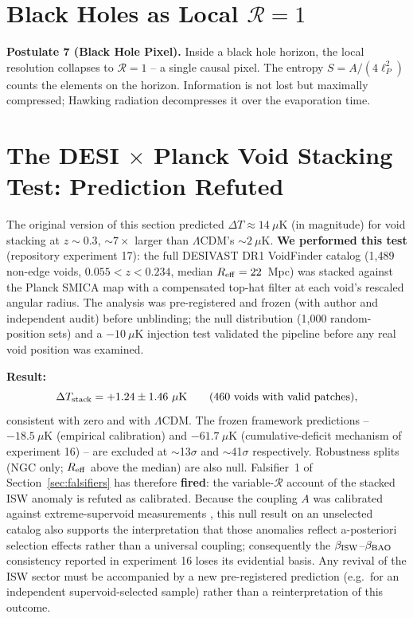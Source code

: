 \documentclass[12pt]{article}
\begin{document}
\section{Black Holes as Local $\mathcal{R}=1$}
\label{sec:bh}

{\bf Postulate 7 (Black Hole Pixel).} Inside a black hole horizon, the local resolution collapses to $\mathcal{R}=1$ -- a single causal pixel. The entropy $S = A/(4\ell_P^2)$ counts the elements on the horizon. Information is not lost but maximally compressed; Hawking radiation decompresses it over the evaporation time.

\section{The DESI $\times$ Planck Void Stacking Test: Prediction Refuted}
\label{sec:prediction}

The original version of this section predicted $\Delta T \approx 14\ \mu$K (in magnitude) for void stacking at $z\sim0.3$, $\sim7\times$ larger than $\Lambda$CDM's $\sim2\ \mu$K. {\bf We performed this test} (repository experiment 17): the full DESIVAST DR1 VoidFinder catalog (1{,}489 non-edge voids, $0.055<z<0.234$, median $R_{\rm eff}=22$~Mpc) was stacked against the Planck SMICA map with a compensated top-hat filter at each void's rescaled angular radius. The analysis was pre-registered and frozen (with author and independent audit) before unblinding; the null distribution (1{,}000 random-position sets) and a $-10\ \mu$K injection test validated the pipeline before any real void position was examined.

{\bf Result:}
\begin{equation}
\Delta T_{\rm stack} = +1.24 \pm 1.46\ \mu\text{K} \qquad (460\ \text{voids with valid patches}),
\end{equation}
consistent with zero and with $\Lambda$CDM. The frozen framework predictions -- $-18.5\ \mu$K (empirical calibration) and $-61.7\ \mu$K (cumulative-deficit mechanism of experiment 16) -- are excluded at $\sim$13$\sigma$ and $\sim$41$\sigma$ respectively. Robustness splits (NGC only; $R_{\rm eff}$ above the median) are also null. Falsifier~1 of Section~\ref{sec:falsifiers} has therefore {\bf fired}: the variable-$\mathcal{R}$ account of the stacked ISW anomaly is refuted as calibrated. Because the coupling $A$ was calibrated against extreme-supervoid measurements \citep{granett2008,hansen2025}, this null result on an unselected catalog also supports the interpretation that those anomalies reflect a-posteriori selection effects rather than a universal coupling; consequently the $\beta_{\rm ISW}$--$\beta_{\rm BAO}$ consistency reported in experiment 16 loses its evidential basis. Any revival of the ISW sector must be accompanied by a new pre-registered prediction (e.g.\ for an independent supervoid-selected sample) rather than a reinterpretation of this outcome.
\end{document}
